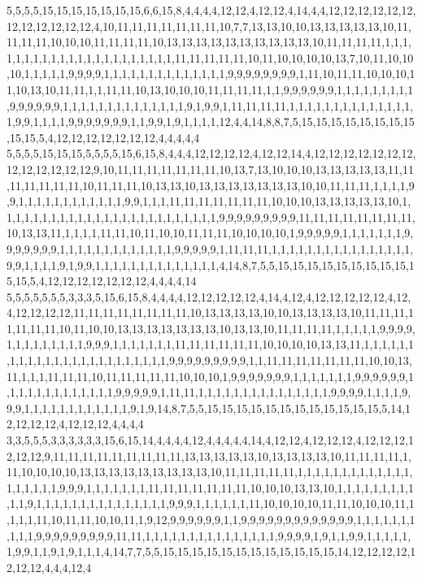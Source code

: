 5,5,5,5,15,15,15,15,15,15,15,6,6,15,8,4,4,4,4,12,12,4,12,12,4,14,4,4,12,12,12,12,12,12,12,12,12,12,12,12,4,10,11,11,11,11,11,11,11,10,7,7,13,13,10,10,13,13,13,13,13,10,11,11,11,11,10,10,10,11,11,11,11,10,13,13,13,13,13,13,13,13,13,13,10,11,11,11,11,1,1,1,1,1,1,1,1,1,1,1,1,1,1,1,1,1,1,1,1,1,1,11,11,11,11,11,10,11,10,10,10,10,13,7,10,11,10,10,10,1,1,1,1,1,9,9,9,9,1,1,1,1,1,1,1,1,1,1,1,1,1,1,9,9,9,9,9,9,9,9,1,11,10,11,11,10,10,10,11,10,13,10,11,11,1,1,11,11,10,13,10,10,10,11,11,11,11,1,1,9,9,9,9,9,9,1,1,1,1,1,1,1,1,1,9,9,9,9,9,9,1,1,1,1,1,1,1,1,1,1,1,1,1,1,9,1,9,9,1,11,11,11,11,1,1,1,1,1,1,1,1,1,1,1,1,1,1,1,9,9,1,1,1,1,9,9,9,9,9,9,9,1,1,9,9,1,9,1,1,1,1,12,4,4,14,8,8,7,5,15,15,15,15,15,15,15,15,15,15,5,4,12,12,12,12,12,12,12,4,4,4,4,4
5,5,5,5,15,15,15,5,5,5,5,15,6,15,8,4,4,4,12,12,12,12,4,12,12,14,4,12,12,12,12,12,12,12,12,12,12,12,12,12,9,10,11,11,11,11,11,11,11,10,13,7,13,10,10,10,13,13,13,13,13,11,11,11,11,11,11,11,10,11,11,11,10,13,13,10,13,13,13,13,13,13,13,10,10,11,11,11,1,1,1,1,9,9,1,1,1,1,1,1,1,1,1,1,1,1,9,9,1,1,1,11,11,11,11,11,11,11,10,10,10,13,13,13,13,13,10,1,1,1,1,1,1,1,1,1,1,1,1,1,1,1,1,1,1,1,1,1,1,1,1,1,9,9,9,9,9,9,9,9,9,11,11,11,11,11,11,11,11,10,13,13,11,1,1,1,1,11,11,10,11,10,10,11,11,11,10,10,10,10,1,9,9,9,9,9,1,1,1,1,1,1,1,9,9,9,9,9,9,9,1,1,1,1,1,1,1,1,1,1,1,1,1,9,9,9,9,9,1,11,11,11,1,1,1,1,1,1,1,1,1,1,1,1,1,1,1,1,9,9,1,1,1,1,9,1,9,9,1,1,1,1,1,1,1,1,1,1,1,1,1,1,4,14,8,7,5,5,15,15,15,15,15,15,15,15,15,15,15,5,4,12,12,12,12,12,12,12,4,4,4,4,14
5,5,5,5,5,5,5,3,3,3,5,15,6,15,8,4,4,4,4,12,12,12,12,12,4,14,4,12,4,12,12,12,12,12,4,12,4,12,12,12,12,11,11,11,11,11,11,11,11,10,13,13,13,13,10,10,13,13,13,13,10,11,11,11,11,11,11,11,10,11,10,10,13,13,13,13,13,13,13,10,13,13,10,11,11,11,11,1,1,1,1,1,9,9,9,9,1,1,1,1,1,1,1,1,1,9,9,9,1,1,1,1,1,1,1,11,11,11,11,11,11,10,10,10,10,13,13,11,1,1,1,1,1,1,1,1,1,1,1,1,1,1,1,1,1,1,1,1,1,1,1,1,9,9,9,9,9,9,9,9,9,1,1,11,11,11,11,11,11,11,10,10,13,11,1,1,1,11,11,11,10,11,11,11,11,11,10,10,10,1,9,9,9,9,9,9,9,1,1,1,1,1,1,1,9,9,9,9,9,9,1,1,1,1,1,1,1,1,1,1,1,1,1,9,9,9,9,9,1,11,11,1,1,1,1,1,1,1,1,1,1,1,1,1,1,1,9,9,9,9,1,1,1,1,9,9,9,1,1,1,1,1,1,1,1,1,1,1,1,9,1,9,14,8,7,5,5,15,15,15,15,15,15,15,15,15,15,15,15,5,14,12,12,12,12,4,12,12,12,4,4,4,4
3,3,5,5,5,3,3,3,3,3,3,15,6,15,14,4,4,4,4,12,4,4,4,4,4,14,4,12,12,4,12,12,12,4,12,12,12,12,12,12,9,11,11,11,11,11,11,11,11,11,13,13,13,13,13,10,13,13,13,13,10,11,11,11,11,1,11,10,10,10,10,13,13,13,13,13,13,13,13,13,10,11,11,11,11,11,1,1,1,1,1,1,1,1,1,1,1,1,1,1,1,1,1,1,1,9,9,9,1,1,1,1,1,1,1,11,11,11,11,11,11,11,10,10,10,13,13,10,1,1,1,1,1,1,1,1,1,1,1,9,1,1,1,1,1,1,1,1,1,1,1,1,1,1,1,9,9,9,1,1,1,1,1,1,11,10,10,10,10,11,11,10,10,10,11,1,1,1,1,11,10,11,11,10,10,11,1,9,12,9,9,9,9,9,9,1,1,9,9,9,9,9,9,9,9,9,9,9,9,9,1,1,1,1,1,1,1,1,1,1,9,9,9,9,9,9,9,9,9,11,11,1,1,1,1,1,1,1,1,1,1,1,1,1,1,1,9,9,9,9,1,9,1,1,9,9,1,1,1,1,1,1,9,9,1,1,9,1,9,1,1,1,4,14,7,7,5,5,15,15,15,15,15,15,15,15,15,15,15,15,14,12,12,12,12,12,12,12,4,4,4,12,4
